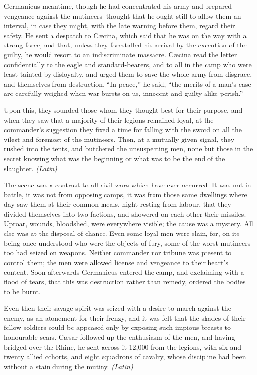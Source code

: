 
Germanicus meantime, though he had concentrated his army and prepared vengeance against the mutineers, thought that he ought still to allow them an interval, in case they might, with the late warning before them, regard their safety. He sent a despatch to Cæcina, which said that he was on the way with a strong force, and that, unless they forestalled his arrival by the execution of the guilty, he would resort to an indiscriminate massacre. Cæcina read the letter confidentially to the eagle and standard-bearers, and to all in the camp who were least tainted by disloyalty, and urged them to save the whole army from disgrace, and themselves from destruction. ``In peace,'' he said, ``the merits of a man's case are carefully weighed when war bursts on us, innocent and guilty alike perish.''

Upon this, they sounded those whom they thought best for their purpose, and when they saw that a majority of their legions remained loyal, at the commander's suggestion they fixed a time for falling with the sword on all the vilest and foremost of the mutineers. Then, at a mutually given signal, they rushed into the tents, and butchered the unsuspecting men, none but those in the secret knowing what was the beginning or what was to be the end of the slaughter. \emph{(Latin)}


The scene was a contrast to all civil wars which have ever occurred. It was not in battle, it was not from opposing camps, it was from those same dwellings where day saw them at their common meals, night resting from labour, that they divided themselves into two factions, and showered on each other their missiles. Uproar, wounds, bloodshed, were everywhere visible; the cause was a mystery. All else was at the disposal of chance. Even some loyal men were slain, for, on its being once understood who were the objects of fury, some of the worst mutineers too had seized on weapons. Neither commander nor tribune was present to control them; the men were allowed license and vengeance to their heart's content. Soon afterwards Germanicus entered the camp, and exclaiming with a flood of tears, that this was destruction rather than remedy, ordered the bodies to be burnt.

Even then their savage spirit was seized with a desire to march against the enemy, as an atonement for their frenzy, and it was felt that the shades of their fellow-soldiers could be appeased only by exposing such impious breasts to honourable scars. Cæsar followed up the enthusiasm of the men, and having bridged over the Rhine, he sent across it 12,000 from the legions, with six-and-twenty allied cohorts, and eight squadrons of cavalry, whose discipline had been without a stain during the mutiny. \emph{(Latin)}

